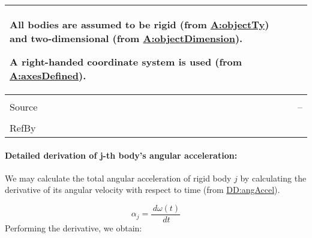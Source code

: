 \documentclass[12pt]{article}
\begin{document}
\begin{minipage}{\textwidth}
\begin{tabular}{>{\raggedright}p{}>{\raggedright\arraybackslash}p{}}
        All bodies are assumed to be rigid (from \hyperref[assumpOT]{A:objectTy}) and two-dimensional (from \hyperref[assumpOD]{A:objectDimension}).
        
        A right-handed coordinate system is used (from \hyperref[assumpAD]{A:axesDefined}).
        
\\ \midrule \\
Source & --
         
\\ \midrule \\
RefBy & 
\\ \bottomrule
\end{tabular}
\end{minipage}
\paragraph{Detailed derivation of j-th body's angular acceleration:}
\label{IM:rotMotDeriv}
We may calculate the total angular acceleration of rigid body $j$ by calculating the derivative of its angular velocity with respect to time (from \hyperref[DD:angAccel]{DD:angAccel}).

\begin{displaymath}
{α_{j}}=\frac{\,dω\left(t\right)}{\,dt}
\end{displaymath}
Performing the derivative, we obtain:
\end{document}
